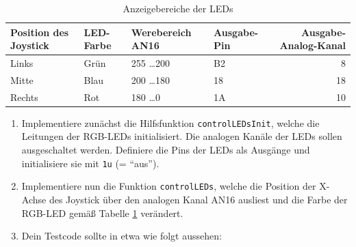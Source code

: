 \begin{table}[!htb]
    \centering
    \caption{Anzeigebereiche der LEDs}
    \label{tab:controlLED}
    \begin{tabular}{llllr}
        \toprule
        \textbf{Position des Joystick} & \textbf{LED-Farbe} & \textbf{Werebereich AN16} & \textbf{Ausgabe-Pin} & \textbf{Ausgabe-Analog-Kanal}\\
        \midrule
        Links & Grün & 255 \dots 200 & B2 & 8\\
        Mitte & Blau & 200 \dots 180 & 18 & 18\\
        Rechts & Rot & 180 \dots 0 & 1A & 10\\
        \bottomrule
    \end{tabular}
\end{table}

\begin{enumerate}
\item
Implementiere zunächst die Hilfsfunktion \lstinline|controlLEDsInit|, welche die Leitungen der RGB-LEDs initialisiert. Die analogen Kanäle der LEDs sollen ausgeschaltet werden.
Definiere die Pins der LEDs als Ausgänge und initialisiere sie mit \lstinline|1u| (= \enquote{aus}). 

\item
Implementiere nun die Funktion \lstinline|controlLEDs|, welche die Position der X-Achse des Joystick über den analogen Kanal AN16 ausliest und die Farbe der RGB-LED gemäß Tabelle \ref{tab:controlLED} verändert. 

\item 
Dein Testcode sollte in etwa wie folgt aussehen:

\end{enumerate}
